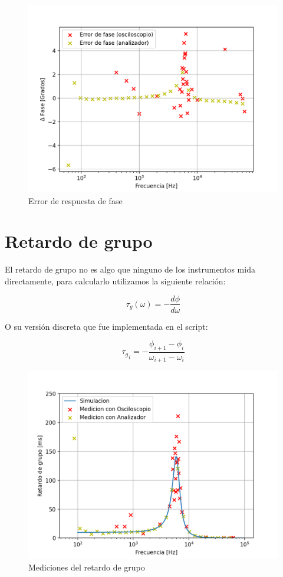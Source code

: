 \documentclass[11pt,a4paper]{report}
\begin{document}
\begin{figure}[H]
\centering
\includegraphics[scale=0.7]{figs/plots/fase_err.png}
\caption{Error de respuesta de fase}
\end{figure}


\section{Retardo de grupo}

El retardo de grupo no es algo que ninguno de los instrumentos mida directamente, para calcularlo utilizamos la siguiente relación:

$$\tau_{g}(\omega) = - \dfrac{d\phi}{d\omega}$$

O su versión discreta que fue implementada en el script:

$${\tau_g}_i = - \dfrac{ \phi_{i+1} - \phi_i }{ \omega_{i+1} - \omega_i }$$


\begin{figure}[H]
\centering
\includegraphics[scale=0.7]{figs/plots/delay.png}
\caption{Mediciones del retardo de grupo}
\end{figure}
\end{document}
